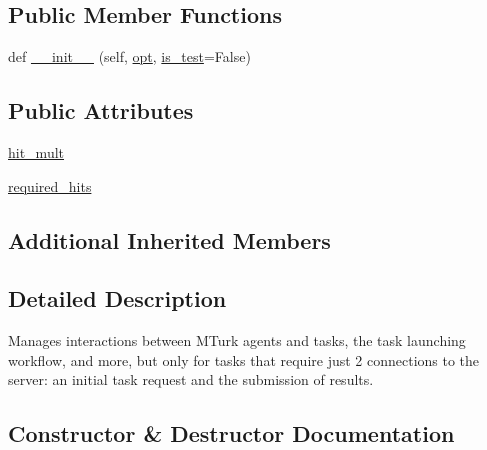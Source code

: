\subsection*{Public Member Functions}
\begin{DoxyCompactItemize}
\item 
def \hyperlink{classparlai_1_1mturk_1_1core_1_1dev_1_1mturk__manager_1_1StaticMTurkManager_aa99bc029283284f4804cae475b46e9f4}{\+\_\+\+\_\+init\+\_\+\+\_\+} (self, \hyperlink{classparlai_1_1mturk_1_1core_1_1dev_1_1mturk__manager_1_1MTurkManager_a07b188c1af35f83c7052aeabc11209d6}{opt}, \hyperlink{classparlai_1_1mturk_1_1core_1_1dev_1_1mturk__manager_1_1MTurkManager_adee3e80e1a38daf5b96ede29d4866e73}{is\+\_\+test}=False)
\end{DoxyCompactItemize}
\subsection*{Public Attributes}
\begin{DoxyCompactItemize}
\item 
\hyperlink{classparlai_1_1mturk_1_1core_1_1dev_1_1mturk__manager_1_1StaticMTurkManager_a060777f184a4d4d5927e2172cacb0cca}{hit\+\_\+mult}
\item 
\hyperlink{classparlai_1_1mturk_1_1core_1_1dev_1_1mturk__manager_1_1StaticMTurkManager_a3d9217d2766c900a597e36a39f80018d}{required\+\_\+hits}
\end{DoxyCompactItemize}
\subsection*{Additional Inherited Members}


\subsection{Detailed Description}
\begin{DoxyVerb}Manages interactions between MTurk agents and tasks, the task launching workflow,
and more, but only for tasks that require just 2 connections to the server: an
initial task request and the submission of results.
\end{DoxyVerb}
 

\subsection{Constructor \& Destructor Documentation}
\mbox{\label{classparlai_1_1mturk_1_1core_1_1dev_1_1mturk__manager_1_1StaticMTurkManager_aa99bc029283284f4804cae475b46e9f4}} 
